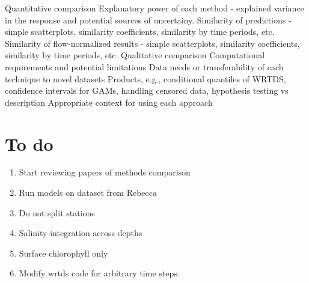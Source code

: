\documentclass[letterpaper,12pt]{article}\usepackage[]{graphicx}\usepackage[]{color}
\begin{document}
\begin{outline}
\2 Quantitative comparison
\3 Explanatory power of each method - explained variance in the response and potential sources of uncertainy.
\3 Similarity of predictions - simple scatterplots, similarity coefficients, similarity by time periods, etc.
\3 Similarity of flow-normalized results - simple scatterplots, similarity coefficients, similarity by time periods, etc.
\2 Qualitative comparison
\3 Computational requirements and potential limitations
\3 Data needs or transferability of each technique to novel datasets
\3 Products, e.g., conditional quantiles of \ac{WRTDS}, confidence intervals for \acp{GAM}, handling censored data, hypothesis testing vs description
\3 Appropriate context for using each approach
\end{outline}

\section{To do}
\begin{enumerate}
\item Start reviewing papers of methods comparison
\item Run models on dataset from Rebecca
\item Do not split stations
\item Salinity-integration across depths
\item Surface chlorophyll only
\item Modify wrtds code for arbitrary time steps
\end{enumerate}
\end{document}
